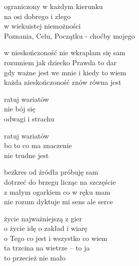 \begin{text}
    ograniczony w każdym kierunku\\
    na osi dobrego i złego\\
    w wiekuistej niemożności\\
    Poznania, Celu, Początku - choćby mojego

    w nieskończoność nie wkraplam się sam\\
    rozumiem jak dziecko Prawda to dar\\
    gdy ważne jest we mnie i kiedy to wiem\\
    każda nieskończoność znów równa jest

    \vin ratuj wariatów\\
    \vin nie bój się\\
    \vin odwagi i strachu

    \vin ratuj wariatów\\
    \vin bo to co ma znaczenie\\
    \vin nie trudne jest

    bezkres od źródła próbuję sam\\
    dotrzeć do brzegu licząc na szczęście\\
    z małym ogarkiem co w ręku mam\\
    nie rozum dyktuje mi sens ale serce

    życie najważniejszą z gier\\
    o życie idę o zakład i wiarę\\
    o Tego co jest i wszystko co wiem\\
    ta trzcina na wietrze – to ja\\
    to przecież nie mało
\end{text}
\begin{chord}

\end{chord}